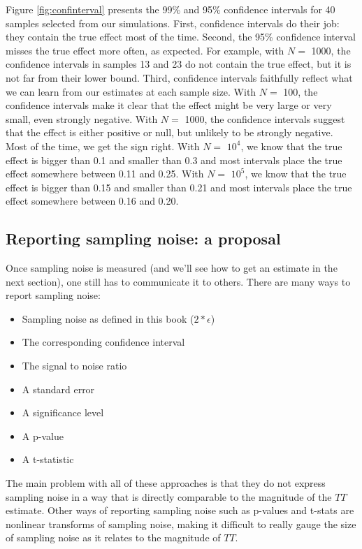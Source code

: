 \documentclass[
]{book}
\providecommand{\tightlist}{%
  \setlength{\itemsep}{0pt}\setlength{\parskip}{0pt}}
\theoremstyle{definition}
\theoremstyle{definition}
\theoremstyle{definition}
\theoremstyle{definition}
\theoremstyle{remark}
\begin{document}
Figure \ref{fig:confinterval} presents the 99\% and 95\% confidence intervals for 40 samples selected from our simulations.
First, confidence intervals do their job: they contain the true effect most of the time.
Second, the 95\% confidence interval misses the true effect more often, as expected.
For example, with \(N=\) 1000, the confidence intervals in samples 13 and 23 do not contain the true effect, but it is not far from their lower bound.
Third, confidence intervals faithfully reflect what we can learn from our estimates at each sample size.
With \(N=\) 100, the confidence intervals make it clear that the effect might be very large or very small, even strongly negative.
With \(N=\) 1000, the confidence intervals suggest that the effect is either positive or null, but unlikely to be strongly negative.
Most of the time, we get the sign right.
With \(N=\) \ensuremath{10^{4}}, we know that the true effect is bigger than 0.1 and smaller than 0.3 and most intervals place the true effect somewhere between 0.11 and 0.25.
With \(N=\) \ensuremath{10^{5}}, we know that the true effect is bigger than 0.15 and smaller than 0.21 and most intervals place the true effect somewhere between 0.16 and 0.20.

\hypertarget{reporting-sampling-noise-a-proposal}{%
\subsection{Reporting sampling noise: a proposal}\label{reporting-sampling-noise-a-proposal}}

Once sampling noise is measured (and we'll see how to get an estimate in the next section), one still has to communicate it to others.
There are many ways to report sampling noise:

\begin{itemize}
\tightlist
\item
  Sampling noise as defined in this book (\(2*\epsilon\))
\item
  The corresponding confidence interval
\item
  The signal to noise ratio
\item
  A standard error
\item
  A significance level
\item
  A p-value
\item
  A t-statistic
\end{itemize}

The main problem with all of these approaches is that they do not express sampling noise in a way that is directly comparable to the magnitude of the \(TT\) estimate.
Other ways of reporting sampling noise such as p-values and t-stats are nonlinear transforms of sampling noise, making it difficult to really gauge the size of sampling noise as it relates to the magnitude of \(TT\).
\end{document}
